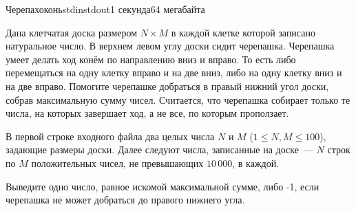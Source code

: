 \begin{problem}{Черепахоконь}{stdin}{stdout}{1 секунда}{64 мегабайта}

Дана клетчатая доска размером $N \times M$ в каждой клетке которой записано натуральное число. В верхнем левом углу доски сидит черепашка. Черепашка умеет делать ход конём по направлению вниз и вправо. То есть либо перемещаться на одну клетку вправо и на две вниз, либо на одну клетку вниз и на две вправо. Помогите черепашке добраться в правый нижний угол доски, собрав максимальную сумму чисел. Считается, что черепашка собирает только те числа, на которых завершает ход, а не все, по которым проползает. 

\InputFile
В первой строке входного файла два целых числа $N$ и $M$ ($1 \le N, M \le 100$), задающие размеры доски. Далее следуют числа, записанные на доске~--- $N$ строк по $M$ положительных чисел, не превышающих $10\,000$, в каждой.



\OutputFile
Выведите одно число, равное искомой максимальной сумме, либо -1, если черепашка не может добраться до правого нижнего угла.

\Examples

\begin{example}
%
\end{example}

\end{problem}
